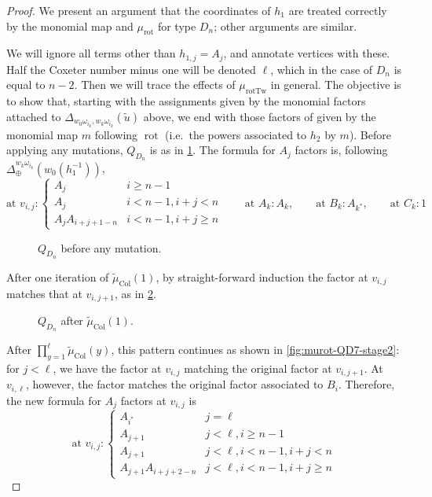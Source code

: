 \documentclass{amsart}
\theoremstyle{plain}
\theoremstyle{definition}
\theoremstyle{remark}
\newcommand{\fundamentalweight}{\omega}
\newcommand{\genminornumerator}[2]{\Delta_{\oplus}^{{#1} {#2}}}
\newcommand{\genminoryz}[3]{\Delta_{{#1} \fundamentalweight_{#3}, {#2}%
    \fundamentalweight_{#3}}}
\newcommand{\monomialmap}{m}
\newcommand{\murot}{{\mu_{\text{rot}}}}
\newcommand{\murottwist}{{\mu_{\text{rotTw}}}}
\newcommand{\muint}[1]{\widetilde{\mu}_{\text{#1}}}
\newcommand{\mucol}{\muint{Col}}
\begin{document}
\begin{proof}
    We present an argument that the coordinates of $h_1$ are treated
    correctly by the monomial map and $\murot$ for type $D_n$; other
    arguments are similar.

    We will ignore all terms other than $h_{1,j} = A_j$, and annotate
    vertices with these. Half the Coxeter number minus one will be
    denoted $\ell$, which in the case of $D_n$ is equal to $n - 2$. Then
    we will trace the effects of $\murottwist$ in general. The objective
    is to show that, starting with the assignments given by the monomial
    factors attached to $\genminoryz{w_0}{w_k}{i_k}(\widetilde{u})$
    above, we end with those factors of given by the monomial map
    $\monomialmap$ following $\operatorname{rot}$ (i.e.\ the powers
    associated to $h_2$ by $\monomialmap$). Before applying any
    mutations, $Q_{D_n}$ is as in \cref{fig:murot-QD7-stage0}. The
    formula for $A_j$ factors is, following
    $\genminornumerator{w_k}{\fundamentalweight_{i_k}}(w_0(h_1^{-1}))$,
    \[ \text{at }v_{i,j} : \begin{cases} A_{j} & i \ge n-1 \\ A_{j} & i
        < n-1, i + j < n \\ A_{j} A_{i+j+1-n} & i < n-1, i + j \ge n
      \end{cases} \qquad \text{at }A_k: A_k, \qquad \text{at }B_k:
      A_{k^{\ast}}, \qquad \text{at }C_k: 1 \]

    \begin{figure}[h]
      \centering
      

      \caption{$Q_{D_n}$ before any mutation.
        \label{fig:murot-QD7-stage0}
      }
    \end{figure}

    After one iteration of $\mucol(1)$, by straight-forward induction
    the factor at $v_{i,j}$ matches that at $v_{i,j+1}$, as in
    \cref{fig:murot-QD7-stage1}.

    \begin{figure}[h]
      \centering
      

      \caption{$Q_{D_n}$ after $\mucol(1)$.
        \label{fig:murot-QD7-stage1}
      }
    \end{figure}

    After $\prod_{y=1}^{\ell} \mucol(y)$, this pattern continues as
    shown in \cref{fig:murot-QD7-stage2}: for $j < \ell$, we have the
    factor at $v_{i,j}$ matching the original factor at $v_{i,j+1}$. At
    $v_{i,\ell}$, however, the factor matches the original factor
    associated to $B_i$. Therefore, the new formula for $A_j$ factors at
    $v_{i,j}$ is \[ \text{at }v_{i,j} : \begin{cases} A_{i^{\ast}} & j =
        \ell \\ A_{j+1} & j < \ell, i \ge n-1 \\ A_{j+1} & j < \ell, i <
        n-1, i + j < n \\ A_{j+1} A_{i+j+2-n} & j < \ell, i < n-1, i + j
        \ge n \end{cases} \]


\end{proof}
\end{document}

